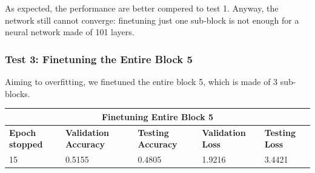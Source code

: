As expected, the performance are better compered to test 1. Anyway, the network still cannot converge: finetuning just one sub-block is not enough for a neural network made of 101 layers. 

\subsubsection{Test 3: Finetuning the Entire Block 5}
Aiming to overfitting, we finetuned the entire block 5, which is made of 3 sub-blocks.

\medskip

\begin{tabular}{ |p{2cm}|p{2cm}|p{2cm}|p{2cm}|p{2cm}|  }
\hline
\multicolumn{5}{|c|}{Finetuning Entire Block 5} \\
\hline
\textbf{Epoch stopped} & \textbf{Validation Accuracy} & \textbf{Testing Accuracy} & \textbf{Validation Loss} & \textbf{Testing Loss} \\
\hline
15 & 0.5155 & 0.4805 & 1.9216 & 3.4421\\
\hline
\end{tabular}

